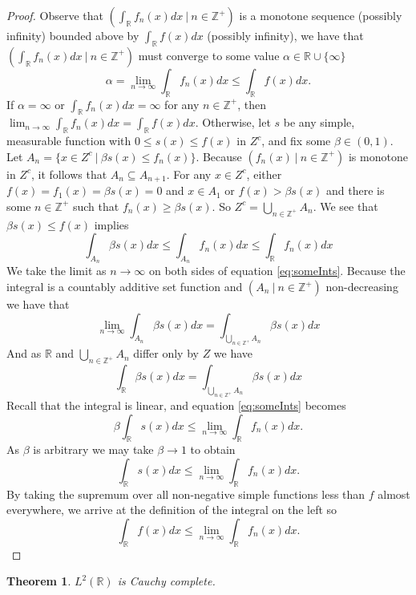 \documentclass{report}
\newtheorem{thm:metricCauchy}[thm:ellwave]{Theorem}
\newcommand{\Z}{\mathbb{Z}}
\newcommand{\R}{\mathbb{R}}
\begin{document}
\begin{proof}
Observe that $\left ( \int_\R f_n(x) dx \ | \ n \in \Z^+ \right)$ is a monotone sequence (possibly infinity) bounded above by $\int_\R   f(x) dx$ (possibly infinity),
we have that $\left ( \int_\R f_n(x) dx \ | \ n \in \Z^+\right )$ must converge to some value $\alpha \in \R\cup\{\infty\}$
$$\alpha = \lim_{n \to \infty} \int_\R f_n(x) dx \leq \int_\R   f(x) dx.$$
If $\alpha = \infty$ or $\int_\R f_n(x) dx=\infty$ for any $n \in \Z^+$, then $\lim_{n \to \infty} \int_\R f_n(x) dx =\int_\R f(x) dx$. Otherwise, let $s$ be any simple, measurable function with $0 \leq s(x) \leq f(x)$ in $Z^c$, and fix some $\beta \in (0,1)$.
Let $A_n=\{x\in Z^c \ | \ \beta s(x) \leq f_n(x) \}$. Because $(f_n(x) \ | \ n \in \Z^+)$ is monotone in $Z^c$, it follows that $A_n \subseteq A_{n+1}$.
For any $x\in Z^c$, either $f(x)=f_1(x)=\beta s(x)=0$ and $x \in A_1$ or $f(x)>\beta s(x)$ and there is some $n \in \Z^+$ such that $f_n(x) \geq \beta s(x)$. So $Z^c = \bigcup_{n \in \Z^+}A_n$.
 We see that $\beta s(x) \leq f(x)$ implies
\begin{equation}
\label{eq:someInts}
\int_{A_n} \beta s(x) dx \leq \int_{A_n}  f_n(x) dx \leq \int_\R f_n(x) dx
\end{equation}
We take the limit as $ n \to \infty $ on both sides of equation \eqref{eq:someInts}. Because the integral is a countably additive set function and $(A_n \ | \ n \in \Z^+)$ non-decreasing we have that 
$$
\lim_{n \to \infty} \int_{A_n} \beta s(x) dx= \int_{\bigcup_{n \in \Z^+}A_n} \beta s(x) dx
$$
And as $\R$ and $\bigcup_{n \in \Z^+} A_n$ differ only by $Z$ we have
$$
\int_\R \beta s(x) dx =\int_{\bigcup_{n \in \Z^+}A_n} \beta s(x) dx
$$
Recall that the integral is linear, and equation \eqref{eq:someInts} becomes
$$
\beta \int_\R  s(x) dx \leq \lim_{n \to \infty} \int_\R f_n(x) dx.
$$
As $\beta$ is arbitrary we may take $\beta \to 1$ to obtain
$$
\int_\R s(x) dx \leq \lim_{n \to \infty} \int_\R f_n(x) dx.
$$
By taking the supremum over all non-negative simple functions less than $f$ almost everywhere, we arrive at the definition of the integral on the left so
$$
\int_\R f(x) dx \leq \lim_{n \to \infty} \int_\R f_n(x) dx.
$$
\end{proof}

\begin{thm:metricCauchy}
$L^2 (\R )$ is Cauchy complete.
\end{thm:metricCauchy}
\end{document}
